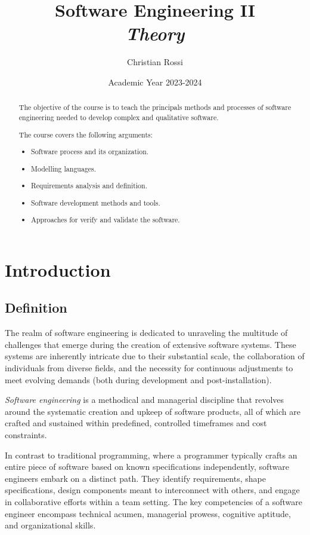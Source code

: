 \documentclass[12pt, a4paper]{report}
\title{Software Engineering II \\ \textit{Theory}}
\author{Christian Rossi}
\date{Academic Year 2023-2024}
\begin{document}
\maketitle

\newpage

\begin{abstract}
    The objective of the course is to teach the principals methods and processes of software engineering needed to develop complex and qualitative software.
     
    The course covers the following arguments:
    \begin{itemize}
        \item Software process and its organization.
        \item Modelling languages.
        \item Requirements analysis and definition.
        \item Software development methods and tools.
        \item Approaches for verify and validate the software.
    \end{itemize}
\end{abstract}

\newpage

\tableofcontents

\newpage

\chapter{Introduction}
    \section{Definition}
    The realm of software engineering is dedicated to unraveling the multitude of challenges that emerge during the creation of extensive software systems.
    These systems are inherently intricate due to their substantial scale, the collaboration of individuals from diverse fields, and the necessity for continuous adjustments to meet evolving demands (both during development and post-installation). 
    \begin{definition}
        \emph{Software engineering} is a methodical and managerial discipline that revolves around the systematic creation and upkeep of software products, all of which are crafted and sustained within predefined, controlled timeframes and cost constraints.
    \end{definition}
    In contrast to traditional programming, where a programmer typically crafts an entire piece of software based on known specifications independently, software engineers embark on a distinct path.
    They identify requirements, shape specifications, design components meant to interconnect with others, and engage in collaborative efforts within a team setting. 
    The key competencies of a software engineer encompass technical acumen, managerial prowess, cognitive aptitude, and organizational skills.
\end{document}

